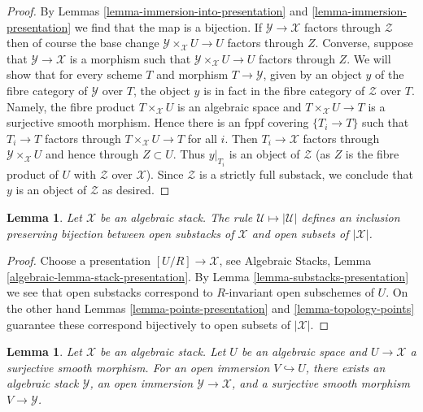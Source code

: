 \documentclass{stacks-project}
\theoremstyle{plain}
\newtheorem{lemma}[subsection]{Lemma}
\theoremstyle{definition}
\theoremstyle{remark}
\numberwithin{equation}{subsection}
\begin{document}
\begin{proof}
By Lemmas \ref{lemma-immersion-into-presentation} and
\ref{lemma-immersion-presentation}
we find that the map is a bijection.
If $\mathcal{Y} \to \mathcal{X}$ factors through $\mathcal{Z}$
then of course the base change $\mathcal{Y} \times_\mathcal{X} U \to U$
factors through $Z$. Converse, suppose that $\mathcal{Y} \to \mathcal{X}$
is a morphism such that $\mathcal{Y} \times_\mathcal{X} U \to U$
factors through $Z$. We will show that for every scheme $T$ and
morphism $T \to \mathcal{Y}$,
given by an object $y$ of the fibre category of $\mathcal{Y}$ over $T$,
the object $y$ is in fact in the fibre category of $\mathcal{Z}$ over $T$.
Namely, the fibre product $T \times_\mathcal{X} U$ is an algebraic
space and $T \times_\mathcal{X} U \to T$ is a surjective smooth morphism.
Hence there is an fppf covering $\{T_i \to T\}$ such that
$T_i \to T$ factors through $T \times_\mathcal{X} U \to T$ for all $i$.
Then $T_i \to \mathcal{X}$ factors through $\mathcal{Y} \times_\mathcal{X} U$
and hence through $Z \subset U$. Thus $y|_{T_i}$ is an object of
$\mathcal{Z}$ (as $Z$ is the fibre product of $U$ with
$\mathcal{Z}$ over $\mathcal{X}$).
Since $\mathcal{Z}$ is a strictly full substack, we conclude
that $y$ is an object of $\mathcal{Z}$ as desired.
\end{proof}

\begin{lemma}
\label{lemma-open-substacks}
Let $\mathcal{X}$ be an algebraic stack. The rule
$\mathcal{U} \mapsto |\mathcal{U}|$ defines an inclusion preserving
bijection between open substacks of $\mathcal{X}$ and open subsets
of $|\mathcal{X}|$.
\end{lemma}

\begin{proof}
Choose a presentation $[U/R] \to \mathcal{X}$, see
Algebraic Stacks, Lemma \ref{algebraic-lemma-stack-presentation}.
By
Lemma \ref{lemma-substacks-presentation}
we see that open substacks correspond to $R$-invariant open subschemes
of $U$. On the other hand
Lemmas \ref{lemma-points-presentation} and \ref{lemma-topology-points}
guarantee these correspond bijectively to open subsets of $|\mathcal{X}|$.
\end{proof}

\begin{lemma}
\label{lemma-open-image-substack}
Let $\mathcal X$ be an algebraic stack. Let $U$ be an algebraic space and
$U \to \mathcal X$ a surjective smooth morphism. For an open immersion
$V \hookrightarrow U$, there exists an algebraic stack $\mathcal Y$, an
open immersion $\mathcal Y \to \mathcal X$, and a surjective smooth
morphism $V \to \mathcal Y$.
\end{lemma}
\end{document}
